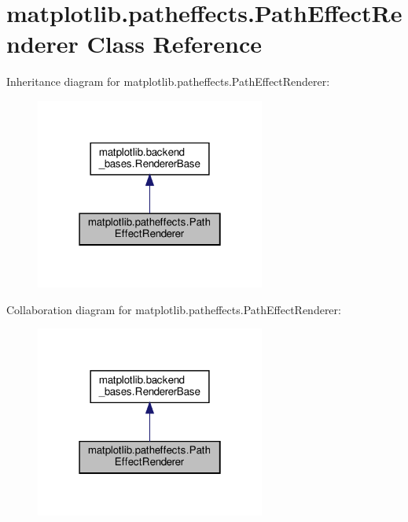 \hypertarget{classmatplotlib_1_1patheffects_1_1PathEffectRenderer}{}\section{matplotlib.\+patheffects.\+Path\+Effect\+Renderer Class Reference}
\label{classmatplotlib_1_1patheffects_1_1PathEffectRenderer}


Inheritance diagram for matplotlib.\+patheffects.\+Path\+Effect\+Renderer\+:
\nopagebreak
\begin{figure}[H]
\begin{center}
\leavevmode
\includegraphics[width=214pt]{classmatplotlib_1_1patheffects_1_1PathEffectRenderer__inherit__graph}
\end{center}
\end{figure}


Collaboration diagram for matplotlib.\+patheffects.\+Path\+Effect\+Renderer\+:
\nopagebreak
\begin{figure}[H]
\begin{center}
\leavevmode
\includegraphics[width=214pt]{classmatplotlib_1_1patheffects_1_1PathEffectRenderer__coll__graph}
\end{center}
\end{figure}
